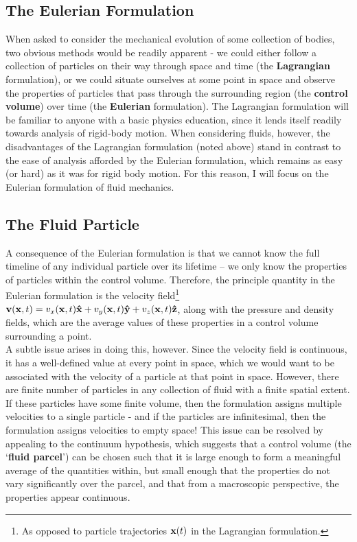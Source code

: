 \subsection{The Eulerian Formulation}

When asked to consider the mechanical evolution of some collection of bodies, two obvious methods would be readily apparent - we could either follow a collection of particles on their way through space and time (the {\bf Lagrangian} formulation), or we could situate ourselves at some point in space and observe the properties of particles that pass through the surrounding region (the {\bf control volume}) over time (the {\bf Eulerian} formulation). The Lagrangian formulation will be familiar to anyone with a basic physics education, since it lends itself readily towards analysis of rigid-body motion. When considering fluids, however, the disadvantages of the Lagrangian formulation (noted above) stand in contrast to the ease of analysis afforded by the Eulerian formulation, which remains as easy (or hard) as it was for rigid body motion. For this reason, I will focus on the Eulerian formulation of fluid mechanics.

\subsection{The Fluid Particle}
A consequence of the Eulerian formulation is that we cannot know the full timeline of any individual particle over its lifetime -- we only know the properties of particles within the control volume. Therefore, the principle quantity in the Eulerian formulation is the {velocity field}\footnote{As opposed to particle trajectories $\mathbf{x}(t)$ in the Lagrangian formulation.} $\mathbf{v}(\mathbf{x},t) = v_x(\mathbf{x},t) \mathbf{\hat{x}} + v_y (\mathbf{x},t)\mathbf{\hat{y}} + v_z(\mathbf{x},t) \mathbf{\hat{z}}$, along with the pressure and density fields, which are the average values of these properties in a control volume surrounding a point. \\

A subtle issue arises in doing this, however. Since the velocity field is continuous, it has a well-defined value at every point in space, which we would want to be associated with the velocity of a particle at that point in space. However, there are finite number of particles in any collection of fluid with a finite spatial extent. If these particles have some finite volume, then the formulation assigns multiple velocities to a single particle - and if the particles are infinitesimal, then the formulation assigns velocities to empty space! This issue can be resolved by appealing to the continuum hypothesis, which suggests that a control volume (the `{\bf fluid parcel}') can be chosen such that it is large enough to form a meaningful average of the quantities within, but small enough that the properties do not vary significantly over the parcel, and that from a macroscopic perspective, the properties appear continuous. \\

